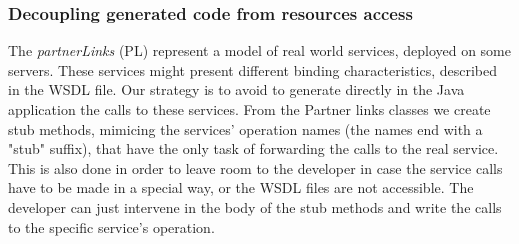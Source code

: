 \subsubsection{Decoupling generated code from resources access}
\label{sec:decouplingPL}
The \textit{partnerLinks} (PL) represent a model of real world services, deployed on some servers. These services might present different binding characteristics, described in the WSDL file. Our strategy is to avoid to generate directly in the Java application the calls to these services. From the Partner links classes we create stub methods, mimicing the services' operation names (the names end with a "stub" suffix), that have the only task of forwarding the calls to the real service. 
This is also done in order to leave room to the developer in case the service calls have to be made in a special way, or the WSDL files are not accessible. The developer can just intervene in the body of the stub methods and write the calls to the specific service's operation.

